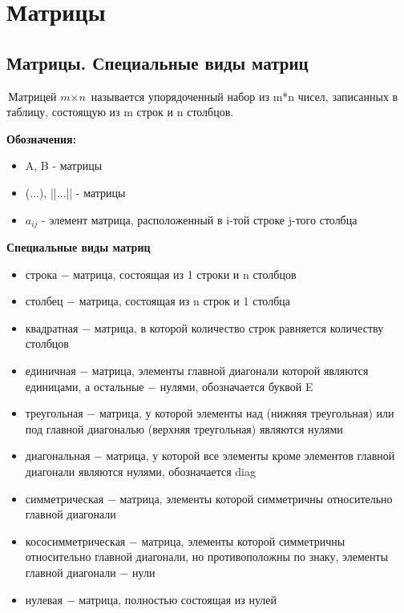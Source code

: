 \section{Матрицы}

\subsection{Матрицы. Специальные виды матриц}

\begin{definition}
	$\textit{Матрицей m$\times$n}$ называется упорядоченный набор из m*n чисел, записанных в таблицу, состоящую из m строк и n столбцов.
\end{definition}



\textbf{Обозначения:}
\begin{itemize}
	\item A, B - матрицы
	\item (...), ||...|| - матрицы
	\item $a_{ij}$ - элемент матрица, расположенный в i-той строке j-того столбца
\end{itemize}


\textbf{Специальные виды матриц}
\begin{itemize}
	\item $\textit{строка}$ $-$ матрица, состоящая из 1 строки и n столбцов
	\item $\textit{столбец}$ $-$ матрица, состоящая из n строк и 1 столбца
	\item $\textit{квадратная}$ $-$ матрица, в которой количество строк равняется количеству столбцов
	\item $\textit{единичная}$ $-$ матрица, элементы главной диагонали которой являются единицами, а остальные $-$ нулями, обозначается буквой E
	\item $\textit{треугольная}$ $-$ матрица, у которой элементы над (нижняя треугольная) или под главной диагональю (верхняя треугольная) являются нулями
	\item $\textit{диагональная}$ $-$ матрица, у которой все элементы кроме элементов главной диагонали являются нулями, обозначается diag
	\item $\textit{симметрическая}$ $-$ матрица, элементы которой симметричны относительно главной диагонали
	\item $\textit{кососимметрическая}$ $-$ матрица, элементы которой симметричны относительно главной диагонали, но противоположны по знаку, элементы главной диагонали $-$ нули
	\item $\textit{нулевая}$ $-$ матрица, полностью состоящая из нулей
\end{itemize}

